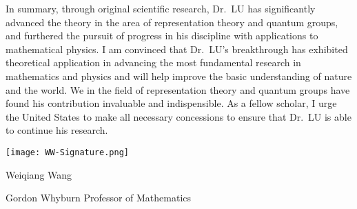 \documentclass[12pt]{amsart} %
\begin{document}
In summary, through original scientific research, Dr.\ LU has significantly advanced the theory in the area of representation theory and quantum groups, and furthered the pursuit of progress in his discipline with applications to mathematical physics. I am convinced that Dr.\ LU's breakthrough has exhibited theoretical application in advancing the most fundamental research in mathematics and physics and will help improve the basic understanding of nature and the world. We in the field of representation theory and quantum groups have found his contribution invaluable and indispensible. As a fellow scholar, I urge the United States to make all necessary concessions to ensure that Dr.\ LU is able to continue his research. 


\vspace{.5cm}

 \texttt{[image: WW-Signature.png]}

Weiqiang Wang

Gordon Whyburn Professor of Mathematics




\end{document}

